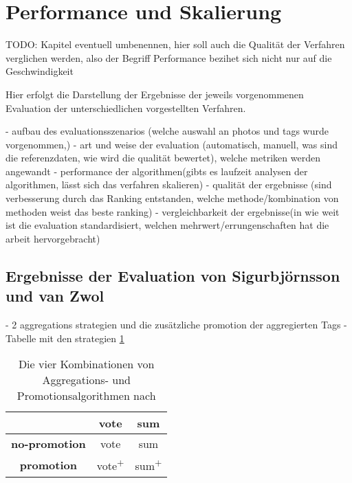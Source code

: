 \section{Performance und Skalierung} %
\label{sec:performance_und_skalierung}

TODO: Kapitel eventuell umbenennen, hier soll auch die Qualität der Verfahren verglichen werden, also der Begriff Performance bezihet sich nicht nur auf die Geschwindigkeit


Hier erfolgt die Darstellung der Ergebnisse der jeweils vorgenommenen Evaluation der unterschiedlichen vorgestellten Verfahren.

- aufbau des evaluationsszenarios (welche auswahl an photos und tags wurde vorgenommen,)
- art und weise der evaluation (automatisch, manuell, was sind die referenzdaten, wie wird die qualität bewertet), welche metriken werden angewandt
- performance der algorithmen(gibts es laufzeit analysen der algorithmen, lässt sich das verfahren skalieren)
- qualität der ergebnisse (sind verbesserung durch das Ranking entstanden, welche methode/kombination von methoden weist das beste ranking)
- vergleichbarkeit der ergebnisse(in wie weit ist die evaluation standardisiert, welchen mehrwert/errungenschaften hat die arbeit hervorgebracht)

\subsection{Ergebnisse der Evaluation von Sigurbjörnsson und van Zwol} %
\label{sub:ergebnisse_der_evaluation_von_collectiveknowledge}

- 2 aggregations strategien und die zusätzliche promotion der aggregierten Tags
- Tabelle mit den strategien \ref{tab:fourStrategiesBjoern}

\begin{table}[htbp]
  \centering
  \begin{tabular}{c|cc}
    \hline
     & \textbf{vote} & \textbf{sum}\\
    \hline
    \textbf{no-promotion} & vote & sum\\
    \hline
    \textbf{promotion} & vote\textsuperscript{+} & sum\textsuperscript{+}\\
    \hline
  \end{tabular}
  \caption{Die vier Kombinationen von Aggregations- und Promotionsalgorithmen nach \cite{collectiveKnowledge}}
  \label{tab:fourStrategiesBjoern}
\end{table}


